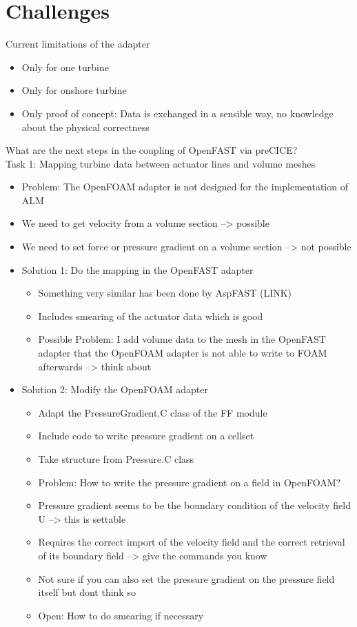 \section{Challenges}
\label{section:challenges}

Current limitations of the adapter
\begin{itemize}
	\item Only for one turbine
	\item Only for onshore turbine
	\item Only proof of concept: Data is exchanged in a sensible way, no knowledge about the physical correctness\\
\end{itemize}

What are the next steps in the coupling of OpenFAST via preCICE?\\

Task 1: Mapping turbine data between actuator lines and volume meshes
\begin{itemize}
	\item Problem: The OpenFOAM adapter is not designed for the implementation of ALM
	\item We need to get velocity from a volume section --> possible
	\item We need to set force or pressure gradient on a volume section --> not possible
	\item Solution 1: Do the mapping in the OpenFAST adapter
	\begin{itemize}
		\item Something very similar has been done by AspFAST (LINK)
		\item Includes smearing of the actuator data which is good
		\item Possible Problem: I add volume data to the mesh in the OpenFAST adapter that the OpenFOAM adapter is not able to write to FOAM afterwards --> think about
	\end{itemize}
	\item Solution 2: Modify the OpenFOAM adapter
		\begin{itemize}
			\item Adapt the PressureGradient.C class of the FF module
			\item Include code to write pressure gradient on a cellset
			\item Take structure from Pressure.C class
			\item Problem: How to write the pressure gradient on a field in OpenFOAM?
			\item Pressure gradient seems to be the boundary condition of the velocity field U --> this is settable
			\item Requires the correct import of the velocity field and the correct retrieval of its boundary field --> give the commands you know
			\item Not sure if you can also set the pressure gradient on the pressure field itself but dont think so
			\item Open: How to do smearing if necessary\\
		\end{itemize}
\end{itemize}

